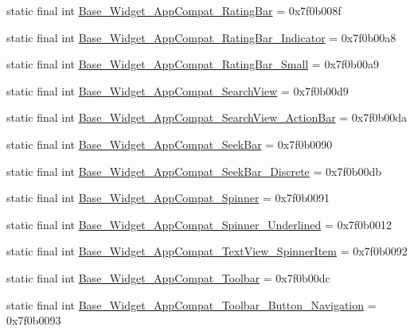 \begin{CompactItemize}
\item 
static final int \hyperlink{classandroid_1_1support_1_1v7_1_1mediarouter_1_1_r_1_1style_32c39ada57b795a51f7450321ccf73ee}{Base\_\-Widget\_\-AppCompat\_\-RatingBar} = 0x7f0b008f
\item 
static final int \hyperlink{classandroid_1_1support_1_1v7_1_1mediarouter_1_1_r_1_1style_a95d9a642906651769c3ff5a6e0ca877}{Base\_\-Widget\_\-AppCompat\_\-RatingBar\_\-Indicator} = 0x7f0b00a8
\item 
static final int \hyperlink{classandroid_1_1support_1_1v7_1_1mediarouter_1_1_r_1_1style_3d349d64603bfdcb0a1212c0bf5bc45f}{Base\_\-Widget\_\-AppCompat\_\-RatingBar\_\-Small} = 0x7f0b00a9
\item 
static final int \hyperlink{classandroid_1_1support_1_1v7_1_1mediarouter_1_1_r_1_1style_bacf7d6d9f1807b9d41a1713338cd39a}{Base\_\-Widget\_\-AppCompat\_\-SearchView} = 0x7f0b00d9
\item 
static final int \hyperlink{classandroid_1_1support_1_1v7_1_1mediarouter_1_1_r_1_1style_84e04a787bdecf61ce68bf1077a1059b}{Base\_\-Widget\_\-AppCompat\_\-SearchView\_\-ActionBar} = 0x7f0b00da
\item 
static final int \hyperlink{classandroid_1_1support_1_1v7_1_1mediarouter_1_1_r_1_1style_72d528816457848fa179bc4c4cf68241}{Base\_\-Widget\_\-AppCompat\_\-SeekBar} = 0x7f0b0090
\item 
static final int \hyperlink{classandroid_1_1support_1_1v7_1_1mediarouter_1_1_r_1_1style_3d1bf36854b831647bfa018f53d2e143}{Base\_\-Widget\_\-AppCompat\_\-SeekBar\_\-Discrete} = 0x7f0b00db
\item 
static final int \hyperlink{classandroid_1_1support_1_1v7_1_1mediarouter_1_1_r_1_1style_2a8c1d45dc7d700bae9ca876725ccecb}{Base\_\-Widget\_\-AppCompat\_\-Spinner} = 0x7f0b0091
\item 
static final int \hyperlink{classandroid_1_1support_1_1v7_1_1mediarouter_1_1_r_1_1style_2d97acb856348aac03321f9d7d454278}{Base\_\-Widget\_\-AppCompat\_\-Spinner\_\-Underlined} = 0x7f0b0012
\item 
static final int \hyperlink{classandroid_1_1support_1_1v7_1_1mediarouter_1_1_r_1_1style_4952d97bbfcd46b4164a06f272adc232}{Base\_\-Widget\_\-AppCompat\_\-TextView\_\-SpinnerItem} = 0x7f0b0092
\item 
static final int \hyperlink{classandroid_1_1support_1_1v7_1_1mediarouter_1_1_r_1_1style_6d327cbf1ce24e6683ee26af94385722}{Base\_\-Widget\_\-AppCompat\_\-Toolbar} = 0x7f0b00dc
\item 
static final int \hyperlink{classandroid_1_1support_1_1v7_1_1mediarouter_1_1_r_1_1style_0e73d25462b4c4b88d68d9fa056a8512}{Base\_\-Widget\_\-AppCompat\_\-Toolbar\_\-Button\_\-Navigation} = 0x7f0b0093

\end{CompactItemize}
